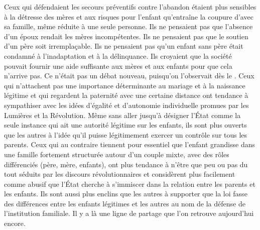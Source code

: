  Ceux qui défendaient les secours préventifs contre l'abandon étaient plus sensibles à la détresse des mères et aux risques pour l'enfant qu'entraîne la coupure d'avec sa famille, même réduite à une seule personne. Ils ne pensaient pas que l'absence d'un époux rendait les mères incompétentes. Ils ne pensaient pas que le soutien d'un père soit irremplaçable. Ils ne pensaient pas qu'un enfant sans père était condamné à l'inadaptation et à la délinquance. Ils croyaient que la société pouvait fournir une aide suffisante aux mères et aux enfants pour que cela n'arrive pas. Ce n'était pas un débat nouveau, puisqu'on l'observait dès le . Ceux qui n'attachent pas une importance déterminante au mariage et à la naissance légitime et qui regardent la paternité avec une certaine distance ont tendance à sympathiser avec les idées d'égalité et d'autonomie individuelle promues par les Lumières et la Révolution. Même sans aller jusqu'à désigner l'État comme la seule instance qui ait une autorité légitime sur les enfants, ils sont plus ouverts que les autres à l'idée qu'il puisse légitimement exercer un contrôle sur tous les parents. Ceux qui au contraire tiennent pour essentiel que l'enfant grandisse dans une famille fortement structurée autour d'un couple mixte, avec des rôles différenciés (père, mère, enfants), ont plus tendance à n'être que peu ou pas du tout séduits par les discours révolutionnaires et considèrent plus facilement comme abusif que l'État cherche à s'immiscer dans la relation entre les parents et les enfants. Ils sont aussi plus enclins que les autres à supporter que la loi fasse des différences entre les enfants légitimes et les autres au nom de la défense de l'institution familiale. Il y a là une ligne de partage que l'on retrouve aujourd'hui encore.
 

